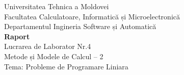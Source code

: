\begin{titlepage}
\begin{center}
	{\large{ Universitatea Tehnica a Moldovei \\}}
	{\large{ Facultatea Calculatoare, Informatică și Microelectronică \\}}
	{\large{ Departamentul Ingineria Software și Automatică \\}}
	\vspace{4cm}
	{\LARGE {\bf{ Raport }}}\\
	\vspace{1cm}
	{\large { Lucrarea de Laborator Nr.4 \\}}
	{\large { Metode și Modele de Calcul – 2 \\}}
	{\large { Tema: Probleme de Programare Liniara \\}}
\end{center}

\vspace{5cm}

 \\
 \\
\noindent{\null} \\
 \\
 \\

\vspace{5cm}

\end{titlepage}
